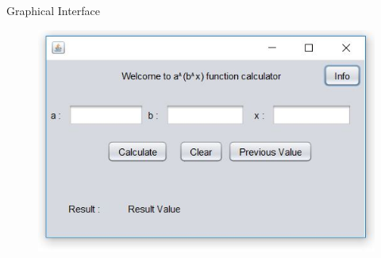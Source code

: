 \documentclass[final]{beamer}
\newlength{\sepwid}
\newlength{\onecolwid}
\newlength{\twocolwid}
\begin{document}
\begin{frame}
\begin{columns}[t]
\begin{column}{\twocolwid}

\begin{alertblock}{\centering Graphical Interface}
\begin{figure}
\includegraphics[height= 0.35 \linewidth]{Calculator_image.JPG}
\end{figure}
\end{alertblock} 


\begin{columns}[t,totalwidth=\twocolwid] %

\begin{column}{\onecolwid} %





\end{column} %
\begin{column}{\sepwid}\end{column} %

\begin{column}{\onecolwid} %





\end{column}
\end{columns}
\end{column}
\end{columns}
\end{frame}
\end{document}
